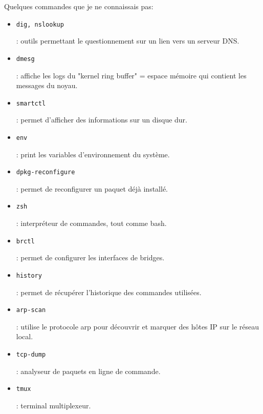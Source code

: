 \documentclass[12pt, a4paper, twoside]{article}
\begin{document}
Quelques commandes que je ne connaissais pas:
\begin{itemize}
    \item \begin{code}\texttt{dig, nslookup}\end{code}: outils permettant le questionnement sur un lien vers un serveur \gls{DNS}. 
    \item \begin{code}\texttt{dmesg}\end{code}: affiche les logs du "kernel ring buffer" = espace mémoire qui contient les messages du noyau.
    \item \begin{code}\texttt{smartctl}\end{code}: permet d'afficher des informations sur un disque dur. 
    \item \begin{code}\texttt{env}\end{code}: print les variables d'environnement du système.
    \item \begin{code}\texttt{dpkg-reconfigure}\end{code}: permet de reconfigurer un paquet déjà installé.
    \item \begin{code}\texttt{zsh}\end{code}: interpréteur de commandes, tout comme bash. 
    \item \begin{code}\texttt{brctl}\end{code}: permet de configurer les interfaces de bridges.
    \item \begin{code}\texttt{history}\end{code}: permet de récupérer l'historique des commandes utilisées.
    \item \begin{code}\texttt{arp-scan}\end{code}: utilise le protocole arp pour découvrir et marquer des hôtes \gls{IP} sur le réseau local.
    \item \begin{code}\texttt{tcp-dump}\end{code}: analyseur de paquets en ligne de commande.
    \item \begin{code}\texttt{tmux}\end{code}: terminal multiplexeur.

\end{itemize}
\end{document}
